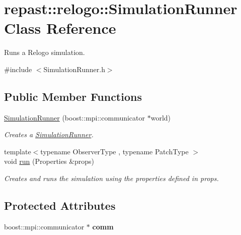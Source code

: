 \hypertarget{classrepast_1_1relogo_1_1_simulation_runner}{\section{repast\-:\-:relogo\-:\-:Simulation\-Runner Class Reference}
\label{classrepast_1_1relogo_1_1_simulation_runner}
}


Runs a Relogo simulation.  




{\ttfamily \#include $<$Simulation\-Runner.\-h$>$}

\subsection*{Public Member Functions}
\begin{DoxyCompactItemize}
\item 
\hypertarget{classrepast_1_1relogo_1_1_simulation_runner_a728e64ef637008c47017cd351b8b067e}{\hyperlink{classrepast_1_1relogo_1_1_simulation_runner_a728e64ef637008c47017cd351b8b067e}{Simulation\-Runner} (boost\-::mpi\-::communicator $\ast$world)}\label{classrepast_1_1relogo_1_1_simulation_runner_a728e64ef637008c47017cd351b8b067e}

\begin{DoxyCompactList}\small\item\em Creates a \hyperlink{classrepast_1_1relogo_1_1_simulation_runner}{Simulation\-Runner}. \end{DoxyCompactList}\item 
{\footnotesize template$<$typename Observer\-Type , typename Patch\-Type $>$ }\\void \hyperlink{classrepast_1_1relogo_1_1_simulation_runner_ac5e8c7119f3278f5c64190e6686e59d0}{run} (Properties \&props)
\begin{DoxyCompactList}\small\item\em Creates and runs the simulation using the properties defined in props. \end{DoxyCompactList}\end{DoxyCompactItemize}
\subsection*{Protected Attributes}
\begin{DoxyCompactItemize}
\item 
\hypertarget{classrepast_1_1relogo_1_1_simulation_runner_a4d616014a9f755de2d32784e449629cf}{boost\-::mpi\-::communicator $\ast$ {\bfseries comm}}\label{classrepast_1_1relogo_1_1_simulation_runner_a4d616014a9f755de2d32784e449629cf}

\end{DoxyCompactItemize}


